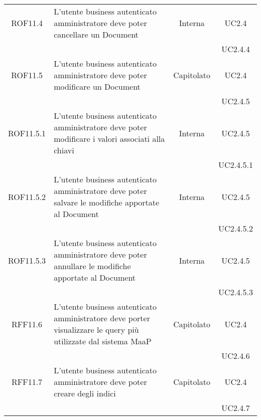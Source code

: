 \begin{longtable}{|c|p{6cm}|c|c|}
\midrule
ROF11.4
& L'utente business autenticato amministratore deve poter cancellare un Document
& Interna
& UC2.4\\
& & & UC2.4.4
\\

\midrule
ROF11.5
& L'utente business autenticato amministratore deve poter modificare un Document
& Capitolato
& UC2.4\\
& & & UC2.4.5
\\

\midrule
ROF11.5.1
& L'utente business autenticato amministratore deve poter modificare i valori associati alla chiavi
& Interna
& UC2.4.5\\
& & & UC2.4.5.1
\\

\midrule
ROF11.5.2
& L'utente business autenticato amministratore deve poter salvare le modifiche apportate al Document
& Interna
& UC2.4.5\\
& & & UC2.4.5.2
\\

\midrule
ROF11.5.3
& L'utente business autenticato amministratore deve poter annullare le modifiche apportate al Document
& Interna
& UC2.4.5\\
& & & UC2.4.5.3
\\

\midrule
RFF11.6
& L'utente business autenticato amministratore deve porter visualizzare le query più utilizzate dal sistema MaaP
& Capitolato
& UC2.4\\
& & & UC2.4.6
\\

\midrule
RFF11.7
& L'utente business autenticato amministratore deve poter creare degli indici
& Capitolato
& UC2.4\\
& & & UC2.4.7
\\

\end{longtable}

\newpage
